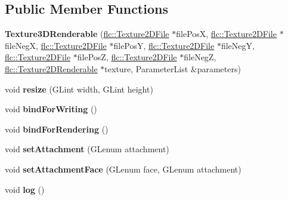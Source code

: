 \subsection*{Public Member Functions}
\begin{DoxyCompactItemize}
\item 
\mbox{\label{classflw_1_1flc_1_1Texture3DRenderable_ae4670b111fb0c286093a40bcb8244aec}} 
{\bfseries Texture3\+D\+Renderable} (\hyperlink{classflw_1_1flc_1_1Texture2DFile}{flc\+::\+Texture2\+D\+File} $\ast$file\+PosX, \hyperlink{classflw_1_1flc_1_1Texture2DFile}{flc\+::\+Texture2\+D\+File} $\ast$file\+NegX, \hyperlink{classflw_1_1flc_1_1Texture2DFile}{flc\+::\+Texture2\+D\+File} $\ast$file\+PosY, \hyperlink{classflw_1_1flc_1_1Texture2DFile}{flc\+::\+Texture2\+D\+File} $\ast$file\+NegY, \hyperlink{classflw_1_1flc_1_1Texture2DFile}{flc\+::\+Texture2\+D\+File} $\ast$file\+PosZ, \hyperlink{classflw_1_1flc_1_1Texture2DFile}{flc\+::\+Texture2\+D\+File} $\ast$file\+NegZ, \hyperlink{classflw_1_1flc_1_1Texture2DRenderable}{flc\+::\+Texture2\+D\+Renderable} $\ast$texture, Parameter\+List \&parameters)
\item 
\mbox{\label{classflw_1_1flc_1_1Texture3DRenderable_af26f145c0e83c1a688c2f2eceb19f857}} 
void {\bfseries resize} (G\+Lint width, G\+Lint height)
\item 
\mbox{\label{classflw_1_1flc_1_1Texture3DRenderable_adfc4215e26cc4f35b6245d6c3acb1b64}} 
void {\bfseries bind\+For\+Writing} ()
\item 
\mbox{\label{classflw_1_1flc_1_1Texture3DRenderable_a6d62a726b2bae4266c4d3505f7ff6096}} 
void {\bfseries bind\+For\+Rendering} ()
\item 
\mbox{\label{classflw_1_1flc_1_1Texture3DRenderable_af87908f03644612c6bc128c8c5855ee4}} 
void {\bfseries set\+Attachment} (G\+Lenum attachment)
\item 
\mbox{\label{classflw_1_1flc_1_1Texture3DRenderable_a5ffda802984116afbaa6c23baa8ccf61}} 
void {\bfseries set\+Attachment\+Face} (G\+Lenum face, G\+Lenum attachment)
\item 
\mbox{\label{classflw_1_1flc_1_1Texture3DRenderable_ac9082f536d5485c04cf1c2b765ec6c1f}} 
void {\bfseries log} ()
\end{DoxyCompactItemize}
